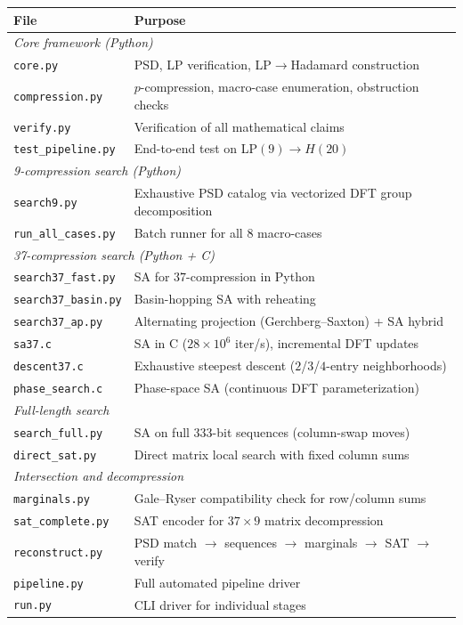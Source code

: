 \documentclass[11pt,a4paper]{article}
\theoremstyle{plain}
\theoremstyle{definition}
\theoremstyle{remark}
\begin{document}
\begin{center}
\small
\begin{tabular}{lp{9cm}}
\toprule
\textbf{File} & \textbf{Purpose} \\
\midrule
\multicolumn{2}{l}{\textit{Core framework (Python)}} \\
\texttt{core.py} & PSD, LP verification, LP$\to$Hadamard construction \\
\texttt{compression.py} & $p$-compression, macro-case enumeration, obstruction checks \\
\texttt{verify.py} & Verification of all mathematical claims \\
\texttt{test\_pipeline.py} & End-to-end test on LP$(9)\to H(20)$ \\[3pt]
\multicolumn{2}{l}{\textit{9-compression search (Python)}} \\
\texttt{search9.py} & Exhaustive PSD catalog via vectorized DFT group decomposition \\
\texttt{run\_all\_cases.py} & Batch runner for all $8$ macro-cases \\[3pt]
\multicolumn{2}{l}{\textit{37-compression search (Python + C)}} \\
\texttt{search37\_fast.py} & SA for $37$-compression in Python \\
\texttt{search37\_basin.py} & Basin-hopping SA with reheating \\
\texttt{search37\_ap.py} & Alternating projection (Gerchberg--Saxton) + SA hybrid \\
\texttt{sa37.c} & SA in C ($28\times10^6$ iter/s), incremental DFT updates \\
\texttt{descent37.c} & Exhaustive steepest descent ($2$/$3$/$4$-entry neighborhoods) \\
\texttt{phase\_search.c} & Phase-space SA (continuous DFT parameterization) \\[3pt]
\multicolumn{2}{l}{\textit{Full-length search}} \\
\texttt{search\_full.py} & SA on full $333$-bit sequences (column-swap moves) \\
\texttt{direct\_sat.py} & Direct matrix local search with fixed column sums \\[3pt]
\multicolumn{2}{l}{\textit{Intersection and decompression}} \\
\texttt{marginals.py} & Gale--Ryser compatibility check for row/column sums \\
\texttt{sat\_complete.py} & SAT encoder for $37\times9$ matrix decompression \\
\texttt{reconstruct.py} & PSD match $\to$ sequences $\to$ marginals $\to$ SAT $\to$ verify \\
\texttt{pipeline.py} & Full automated pipeline driver \\
\texttt{run.py} & CLI driver for individual stages \\
\bottomrule
\end{tabular}
\end{center}
\end{document}
